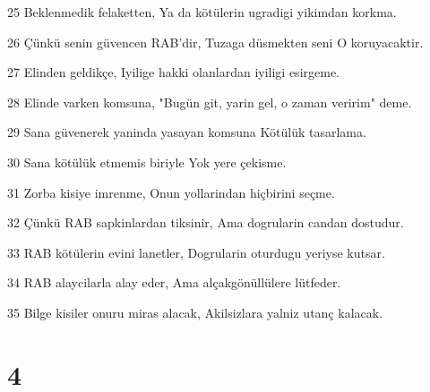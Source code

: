 \par 25 Beklenmedik felaketten, Ya da kötülerin ugradigi yikimdan korkma.
\par 26 Çünkü senin güvencen RAB'dir, Tuzaga düsmekten seni O koruyacaktir.
\par 27 Elinden geldikçe, Iyilige hakki olanlardan iyiligi esirgeme.
\par 28 Elinde varken komsuna, "Bugün git, yarin gel, o zaman veririm" deme.
\par 29 Sana güvenerek yaninda yasayan komsuna Kötülük tasarlama.
\par 30 Sana kötülük etmemis biriyle Yok yere çekisme.
\par 31 Zorba kisiye imrenme, Onun yollarindan hiçbirini seçme.
\par 32 Çünkü RAB sapkinlardan tiksinir, Ama dogrularin candan dostudur.
\par 33 RAB kötülerin evini lanetler, Dogrularin oturdugu yeriyse kutsar.
\par 34 RAB alaycilarla alay eder, Ama alçakgönüllülere lütfeder.
\par 35 Bilge kisiler onuru miras alacak, Akilsizlara yalniz utanç kalacak.

\chapter{4}

